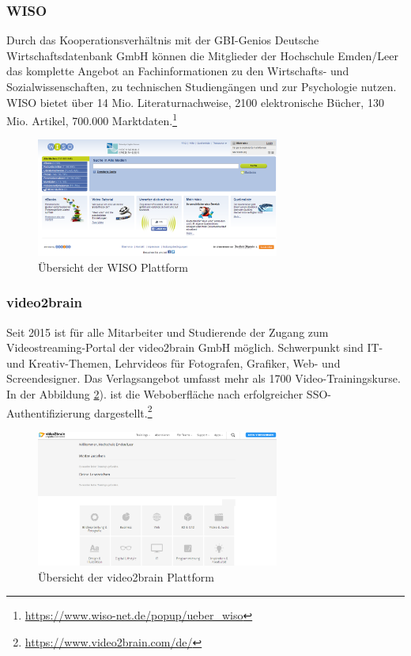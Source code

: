 \subsubsection{WISO}
Durch das Kooperationsverhältnis mit der GBI-Genios Deutsche Wirtschaftsdatenbank GmbH können die Mitglieder der Hochschule Emden/Leer das komplette Angebot an Fachinformationen zu den Wirtschafts- und Sozialwissenschaften, zu technischen Studiengängen und zur Psychologie  nutzen. WISO bietet über 14 Mio. Literaturnachweise, 2100 elektronische Bücher, 130 Mio. Artikel, 700.000 Marktdaten.\footnote{\url{https://www.wiso-net.de/popup/ueber_wiso}}

\begin{figure}[h!]
	\centering
	\includegraphics[width=8cm]{kapitel/gruppe2/bilder/wiso_plattform.png}
	\caption{Übersicht der WISO Plattform}
	\label{fig_wiso_plattform.png}
\end{figure}

\subsubsection{video2brain}
Seit 2015 ist für alle Mitarbeiter und Studierende der Zugang zum Videostreaming-Portal der video2brain GmbH möglich. Schwerpunkt sind IT- und Kreativ-Themen, Lehrvideos für Fotografen, Grafiker, Web- und Screendesigner. Das Verlagsangebot umfasst mehr als 1700 Video-Trainingskurse. In der Abbildung \ref{fig_video2brain_suchergebnis}). ist die Weboberfläche nach erfolgreicher SSO-Authentifizierung dargestellt.\footnote{\url{https://www.video2brain.com/de/}}

\begin{figure}[h!]
	\centering
	\includegraphics[width=8cm]{kapitel/gruppe2/bilder/video2brain_suche}
	\caption{Übersicht der video2brain Plattform}
	\label{fig_video2brain_suchergebnis}
\end{figure}

